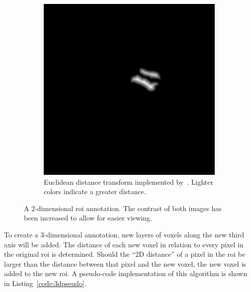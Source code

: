 \begin{figure}[H]
\begin{subfigure}[t]{0.4\textwidth}
        \includegraphics[width=\textwidth]{img/img_dist_mr1a.jpg}
        \caption{Euclidean distance transform implemented by~\cite{2020SciPy-NMeth}. Lighter colors indicate a greater distance.}\label{fig:2d-dist}
    \end{subfigure}
    \caption{A 2-dimensional \ac{roi} annotation. The contrast of both images has been increased to allow for easier viewing.}
    \label{fig:2d-annotation}
\end{figure}


To create a 3-dimensional annotation, new layers of voxels along the new
third axis will be added. The distance of each new voxel in relation to 
every pixel in the original \ac{roi} is determined. Should the 
\enquote{2D distance} of a pixel in the \ac{roi} be larger than the 
distance between that pixel and the new voxel, the new voxel is added to 
the new \ac{roi}. A pseudo-code implementation of this algorithm is shown
in Listing~\ref{code:3dpseudo}.

